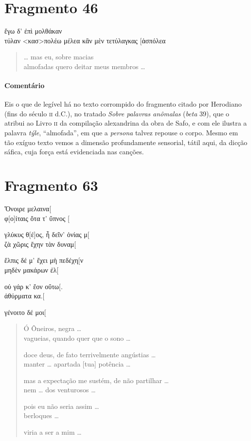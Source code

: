 \section{Fragmento 46}

\begin{gkverse}
ἔγω δ’ ἐπὶ μολθάκαν\\
τύλαν <κασ>πολέω \dagger{}μέλεα κἂν μὲν τετύλαγκας [ἀσπόλεα\dagger{}
\end{gkverse}

\begin{verse}
\ldots{} mas eu, sobre macias\\
almofadas quero deitar meus membros \ldots{}
\end{verse}

\medskip

{\paragraph{Comentário} Eis o que de legível há no texto corrompido do fragmento citado por Herodiano (fins do século \textsc{ii} d.C.), no tratado \textit{Sobre palavras anômalas} (\textit{beta} 39), que o atribui ao Livro \textsc{ii} da compilação alexandrina da obra de Safo, e com ele ilustra a palavra \textit{týle}, ``almofada'', em que a \textit{persona} talvez repouse o corpo. Mesmo em tão exíguo texto vemos a dimensão profundamente sensorial, tátil aqui, da dicção sáfica, cuja força está evidenciada nas canções.}



\pagebreak
\section{Fragmento 63}

\begin{gkverse}
Ὄνοιρε μελαινα[\\
φ[ο]ίταις ὄτα τ’ ὔπνος [

γλύκυς θ[έ]ος, ἦ δεῖν’ ὀνίας μ[\\
ζὰ χῶρις ἔχην τὰν δυναμ[

ἔλπις δέ μ’ ἔχει μὴ πεδέχη[ν\\
μηδὲν μακάρων ἐλ[

οὐ γάρ κ’ ἔον οὔτω[.   \\
ἀθύρματα κα.[

γένοιτο δέ μοι[
\end{gkverse}

\begin{verse}
Ó Ôneiros, negra \ldots{}\\
vagueias, quando quer que o sono \ldots{}

doce deus, de fato terrivelmente angústias \ldots{}\\
manter \ldots{} apartada [tua] potência \ldots{}

mas a expectação me sustém, de não partilhar \ldots{}\\
nem \ldots{}  dos venturosos \ldots{}

pois eu não seria assim \ldots{}\\
berloques \ldots{}

viria a ser a mim \ldots{}
\end{verse}


